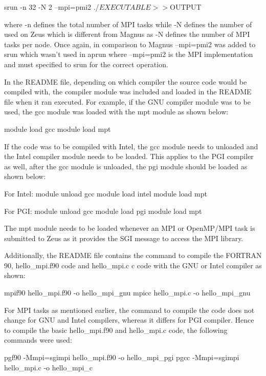 \begin{Document}
srun -n 32 -N 2 --mpi=pmi2 ./$EXECUTABLE >> ${OUTPUT}

where -n defines the total number of MPI tasks while -N defines the number of used on Zeus which is different from Magnus as -N defines the number of
MPI tasks per node. Once again, in comparison to Magnus --mpi=pmi2 was added to srun which wasn't used in aprun where --mpi=pmi2 is the MPI
implementation and must specified to srun for the correct operation.

In the README file, depending on which compiler the source code would be compiled with, the compiler module was included and loaded in the README file 
when it ran executed. For example, if the GNU compiler module was to be used, the gcc module was loaded with the mpt module as shown below:

module load gcc
module load mpt

If the code was to be compiled with Intel, the gcc module needs to unloaded and the Intel compiler module needs to be loaded. This applies to the PGI
compiler as well, after the gcc module is unloaded, the pgi module should be loaded as shown below:

For Intel:
module unload gcc
module load intel
module load mpt

For PGI:
module unload gcc
module load pgi
module load mpt

The mpt module needs to be loaded whenever an MPI or OpenMP/MPI task is submitted to Zeus as it provides the SGI message to access the MPI library.

Additionally, the README file contains the command to compile the FORTRAN 90, hello_mpi.f90 code  and hello_mpi.c c code with the GNU or Intel compiler 
as shown:

mpif90 hello_mpi.f90 -o hello_mpi_gnu
mpicc hello_mpi.c -o hello_mpi_gnu

For MPI tasks as mentioned earlier, the command to compile the code does not change for GNU and Intel compilers, whereas it differs for PGI compiler.
Hence to compile the basic hello_mpi.f90 and hello_mpi.c code, the following commands were used:

pgf90 -Mmpi=sgimpi hello_mpi.f90 -o hello_mpi_pgi
pgcc -Mmpi=sgimpi hello_mpi.c -o hello_mpi_c 
  













\end{Document}
